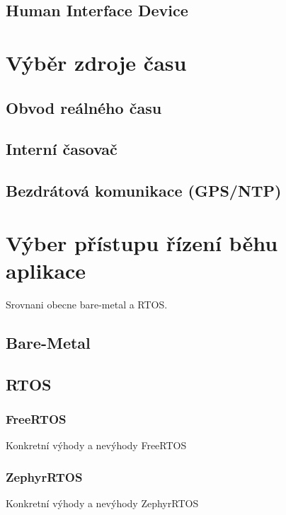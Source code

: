 \subsection{Human Interface Device}

\section{Výběr zdroje času}

\subsection{Obvod reálného času}

\subsection{Interní časovač}

\subsection{Bezdrátová komunikace (GPS/NTP)}

\section{Výber přístupu řízení běhu aplikace}
Srovnani obecne bare-metal a RTOS.


\subsection{Bare-Metal}

\subsection{RTOS}
\subsubsection{FreeRTOS}
Konkretní výhody a nevýhody FreeRTOS

\subsubsection{ZephyrRTOS}
Konkretní výhody a nevýhody ZephyrRTOS

